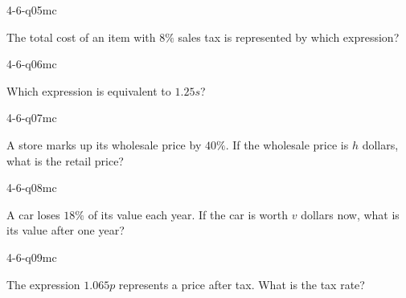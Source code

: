 \begin{practiceQuestion}{4-6-q05}{mc}
\begin{questionText}
The total cost of an item with $8\%$ sales tax is represented by which expression?
\end{questionText}
\end{practiceQuestion}

\begin{practiceQuestion}{4-6-q06}{mc}
\begin{questionText}
Which expression is equivalent to $1.25s$?
\end{questionText}
\end{practiceQuestion}

\begin{practiceQuestion}{4-6-q07}{mc}
\begin{questionText}
A store marks up its wholesale price by $40\%$. If the wholesale price is $h$ dollars, what is the retail price?
\end{questionText}
\end{practiceQuestion}

\begin{practiceQuestion}{4-6-q08}{mc}
\begin{questionText}
A car loses $18\%$ of its value each year. If the car is worth $v$ dollars now, what is its value after one year?
\end{questionText}
\end{practiceQuestion}

\begin{practiceQuestion}{4-6-q09}{mc}
\begin{questionText}
The expression $1.065p$ represents a price after tax. What is the tax rate?
\end{questionText}
\end{practiceQuestion}

